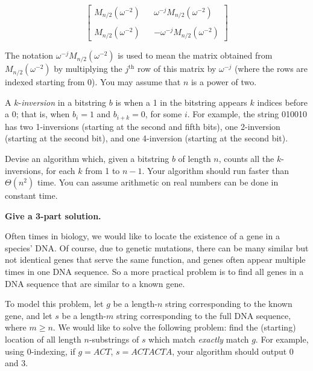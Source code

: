 \documentclass[11pt]{article}
\begin{document}
\begin{enumerate}[label=(\alph), resume]
 \[
 \left[
 \begin{array}{ccc}
 M_{n/2}(\omega^{-2}) & & \omega^{-j}M_{n/2}(\omega^{-2}) \\
                    & & \\
 M_{n/2}(\omega^{-2}) & & -\omega^{-j}M_{n/2}(\omega^{-2})
 \end{array}
 \right]
 \]

 The notation $\omega^{-j}M_{n/2}(\omega^{-2})$ is used to mean the matrix obtained from $M_{n/2}(\omega^{-2})$ by multiplying the $j^\text{th}$ row of this matrix by $\omega^{-j}$ (where the rows are indexed starting from 0). You may assume that $n$ is a power of two.

\end{enumerate}

A $k$-\textit{inversion} in a bitstring $b$ is when a 1 in the bitstring appears $k$ indices before a 0; that is, when $b_i=1$ and $b_{i+k}=0$, for some $i$. For example, the string 010010 has two 1-inversions (starting at the second and fifth bits), one 2-inversion (starting at the second bit), and one 4-inversion (starting at the second bit).

Devise an algorithm which, given a bitstring $b$ of length $n$, counts all the $k$-inversions, for each $k$ from 1 to $n-1$. Your algorithm should run faster than $\Theta(n^2)$ time. You can assume arithmetic on real numbers can be done in constant time.

\textbf{Give a 3-part solution.}

Often times in biology, we would like to locate the existence of a gene in a species' DNA. Of course, due to genetic mutations, 
there can be many similar but not identical genes that serve the same function, and genes often appear multiple times in one DNA sequence. 
So a more practical problem is to find all genes in a DNA sequence that are similar to a known gene.

To model this problem, let $g$ be a length-$n$ string corresponding to the known gene, and let $s$ be 
a length-$m$ string corresponding to the full DNA sequence, where $m \geq n$. We would like to solve the following problem:
find the (starting) location of all length $n$-substrings of $s$ which match \emph{exactly} match $g$.
For example, using $0$-indexing, if $g = ACT$, $s = ACTACTA$, your algorithm should output $0$ and $3$.
\end{document}
